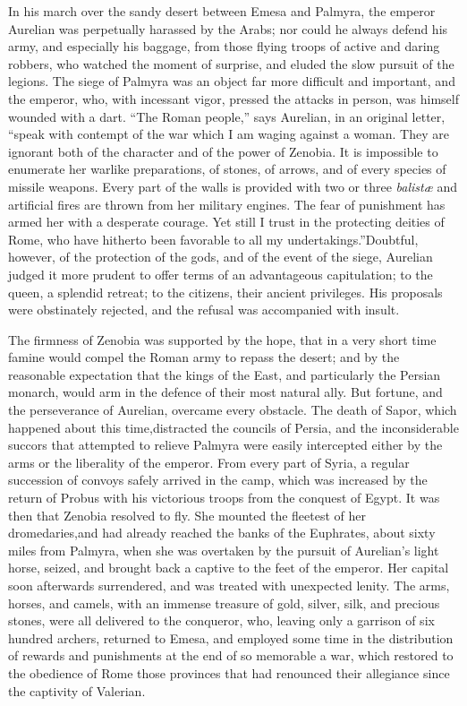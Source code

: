 In his march over the sandy desert between Emesa and Palmyra, the
emperor Aurelian was perpetually harassed by the Arabs; nor could
he always defend his army, and especially his baggage, from those
flying troops of active and daring robbers, who watched the
moment of surprise, and eluded the slow pursuit of the legions.
The siege of Palmyra was an object far more difficult and
important, and the emperor, who, with incessant vigor, pressed
the attacks in person, was himself wounded with a dart. “The
Roman people,” says Aurelian, in an original letter, “speak with
contempt of the war which I am waging against a woman. They are
ignorant both of the character and of the power of Zenobia. It is
impossible to enumerate her warlike preparations, of stones, of
arrows, and of every species of missile weapons. Every part of
the walls is provided with two or three \textit{balistæ} and artificial
fires are thrown from her military engines. The fear of
punishment has armed her with a desperate courage. Yet still I
trust in the protecting deities of Rome, who have hitherto been
favorable to all my undertakings.”\footnotemark[70] Doubtful, however, of the
protection of the gods, and of the event of the siege, Aurelian
judged it more prudent to offer terms of an advantageous
capitulation; to the queen, a splendid retreat; to the citizens,
their ancient privileges. His proposals were obstinately
rejected, and the refusal was accompanied with insult.


The firmness of Zenobia was supported by the hope, that in a very
short time famine would compel the Roman army to repass the
desert; and by the reasonable expectation that the kings of the
East, and particularly the Persian monarch, would arm in the
defence of their most natural ally. But fortune, and the
perseverance of Aurelian, overcame every obstacle. The death of
Sapor, which happened about this time,\footnotemark[71] distracted the councils
of Persia, and the inconsiderable succors that attempted to
relieve Palmyra were easily intercepted either by the arms or the
liberality of the emperor. From every part of Syria, a regular
succession of convoys safely arrived in the camp, which was
increased by the return of Probus with his victorious troops from
the conquest of Egypt. It was then that Zenobia resolved to fly.
She mounted the fleetest of her dromedaries,\footnotemark[72] and had already
reached the banks of the Euphrates, about sixty miles from
Palmyra, when she was overtaken by the pursuit of Aurelian’s
light horse, seized, and brought back a captive to the feet of
the emperor. Her capital soon afterwards surrendered, and was
treated with unexpected lenity. The arms, horses, and camels,
with an immense treasure of gold, silver, silk, and precious
stones, were all delivered to the conqueror, who, leaving only a
garrison of six hundred archers, returned to Emesa, and employed
some time in the distribution of rewards and punishments at the
end of so memorable a war, which restored to the obedience of
Rome those provinces that had renounced their allegiance since
the captivity of Valerian.

